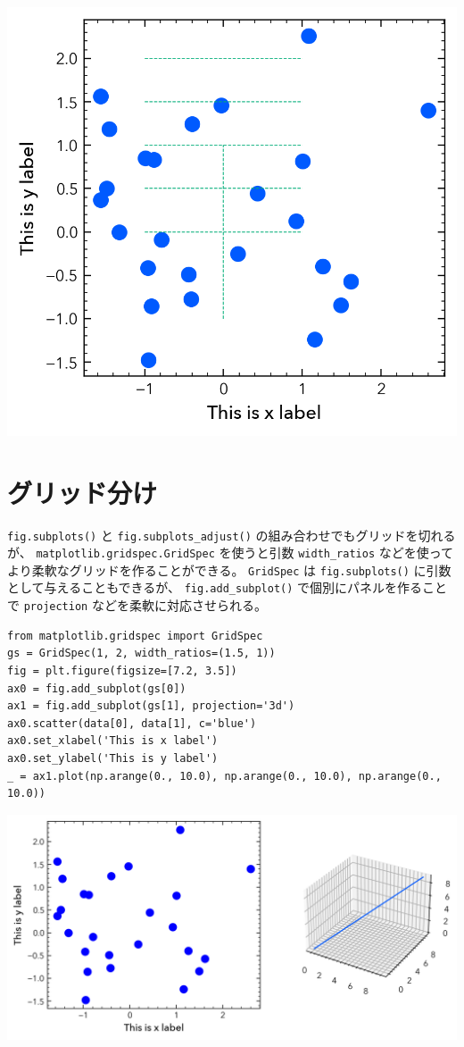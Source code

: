 \documentclass[a4paper, 10pt, notitlepage, twocolumn, uplatex, oneside, dvipdfmx]{jsarticle}
\begin{document}
\begin{center}
\includegraphics[width=1.0\linewidth]{./obipy-resources/params_lines.png}
\end{center}
\section{グリッド分け}
\label{sec:org5e1b2b1}
\texttt{fig.subplots()} と \texttt{fig.subplots\_adjust()} の組み合わせでもグリッドを切れるが、
\texttt{matplotlib.gridspec.GridSpec} を使うと引数 \texttt{width\_ratios} などを使ってより柔軟なグリッドを作ることができる。
\texttt{GridSpec} は \texttt{fig.subplots()} に引数として与えることもできるが、
\texttt{fig.add\_subplot()} で個別にパネルを作ることで \texttt{projection} などを柔軟に対応させられる。
\begin{verbatim}
from matplotlib.gridspec import GridSpec
gs = GridSpec(1, 2, width_ratios=(1.5, 1))
fig = plt.figure(figsize=[7.2, 3.5])
ax0 = fig.add_subplot(gs[0])
ax1 = fig.add_subplot(gs[1], projection='3d')
ax0.scatter(data[0], data[1], c='blue')
ax0.set_xlabel('This is x label')
ax0.set_ylabel('This is y label')
_ = ax1.plot(np.arange(0., 10.0), np.arange(0., 10.0), np.arange(0., 10.0))
\end{verbatim}

\begin{center}
\includegraphics[width=1.0\linewidth]{./obipy-resources/params_grids.png}
\end{center}
\end{document}

